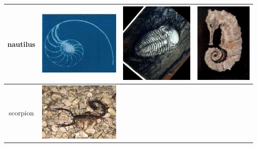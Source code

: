 \documentclass{article}
\begin{document}
\begin{table}[Ht]
\begin{tabular}{| c | c | c | c |}
\hline
nautilus &
\vspace{0cm}\includegraphics[scale=.1]{"Figures/Best Matches/bestmatch_c2"} &
\vspace{0cm}\includegraphics[scale=.1]{"Figures/False Matches/class_2_most_sure_wrong"} &
\vspace{0cm}\includegraphics[scale=.1]{"Figures/False Matches/class_2_least_sure_wrong"} \\
\hline
scorpion &
\vspace{0cm}\includegraphics[scale=.1]{"Figures/Best Matches/bestmatch_c3"} &

\end{tabular}
\end{table}
\end{document}

